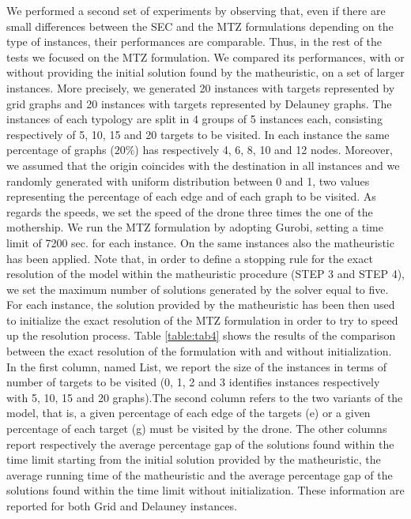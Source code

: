 \noindent
We performed a second set of experiments by observing that, even if there are small differences between the SEC and the MTZ formulations depending on the type of instances, their performances are comparable.
Thus, in the rest of the tests we focused on the MTZ formulation. We compared its performances, with or without providing the initial solution found by the matheuristic, on a set of larger instances. More precisely, we generated 20 instances with targets represented by grid graphs and 20 instances with targets represented by Delauney graphs. The instances of each typology are split in 4 groups of 5 instances each, consisting respectively of 5, 10, 15 and 20 targets to be visited.
In each instance the same percentage of graphs ($20\%$) has respectively 4, 6, 8, 10 and 12 nodes. 
Moreover, we assumed that the origin coincides with the destination in all instances and we randomly generated with uniform distribution between 0 and 1, two values representing the percentage of each edge and of each graph to be visited.
As regards the speeds, we set the speed of the drone three times the one of the mothership.
We run the MTZ formulation by adopting Gurobi, setting a time limit of 7200 sec. for each instance.
On the same instances also the matheuristic has been applied. Note that, in order to define a stopping rule for the exact resolution of the \AMD\xspace model within the matheuristic procedure (STEP 3 and STEP 4), we set the maximum number of solutions generated by the solver equal to five.
For each instance, the solution provided by the matheuristic has been then used to initialize the exact resolution of the MTZ formulation in order to try to speed up the resolution process.
Table \ref{table:tab4} shows the results of the comparison between the exact resolution of the formulation with and without initialization. In the first column, named List, we report the size of the instances in terms of number of targets to be visited (0, 1, 2 and 3 identifies instances respectively with 5, 10, 15 and 20 graphs).The second column refers to the two variants of the model, that is, a given percentage of each edge of the targets (e) or a given percentage of each target (g) must be visited by the drone. The other columns report respectively the average percentage gap of the solutions found within the time limit starting from the initial solution provided by the matheuristic, the average running time of the matheuristic and the average percentage gap of the solutions found within the time limit without initialization. These information are reported for both Grid and Delauney instances.

